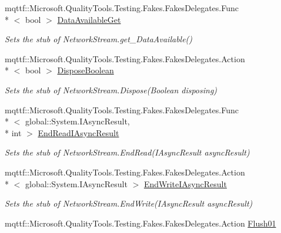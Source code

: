 \begin{DoxyCompactItemize}
mqttf\-::\-Microsoft.\-Quality\-Tools.\-Testing.\-Fakes.\-Fakes\-Delegates.\-Func\\*
$<$ bool $>$ \hyperlink{class_system_1_1_net_1_1_sockets_1_1_fakes_1_1_stub_network_stream_a80472e11e8e2899d3ed3ba4c75589400}{Data\-Available\-Get}
\begin{DoxyCompactList}\small\item\em Sets the stub of Network\-Stream.\-get\-\_\-\-Data\-Available()\end{DoxyCompactList}\item 
mqttf\-::\-Microsoft.\-Quality\-Tools.\-Testing.\-Fakes.\-Fakes\-Delegates.\-Action\\*
$<$ bool $>$ \hyperlink{class_system_1_1_net_1_1_sockets_1_1_fakes_1_1_stub_network_stream_a6d42717e5de4bef02ac4aacc6b019490}{Dispose\-Boolean}
\begin{DoxyCompactList}\small\item\em Sets the stub of Network\-Stream.\-Dispose(\-Boolean disposing)\end{DoxyCompactList}\item 
mqttf\-::\-Microsoft.\-Quality\-Tools.\-Testing.\-Fakes.\-Fakes\-Delegates.\-Func\\*
$<$ global\-::\-System.\-I\-Async\-Result, \\*
int $>$ \hyperlink{class_system_1_1_net_1_1_sockets_1_1_fakes_1_1_stub_network_stream_a0d65abf86c23200970a6363f9e402490}{End\-Read\-I\-Async\-Result}
\begin{DoxyCompactList}\small\item\em Sets the stub of Network\-Stream.\-End\-Read(\-I\-Async\-Result async\-Result)\end{DoxyCompactList}\item 
mqttf\-::\-Microsoft.\-Quality\-Tools.\-Testing.\-Fakes.\-Fakes\-Delegates.\-Action\\*
$<$ global\-::\-System.\-I\-Async\-Result $>$ \hyperlink{class_system_1_1_net_1_1_sockets_1_1_fakes_1_1_stub_network_stream_a7675e9edc46f8d6b9d215056907ff393}{End\-Write\-I\-Async\-Result}
\begin{DoxyCompactList}\small\item\em Sets the stub of Network\-Stream.\-End\-Write(\-I\-Async\-Result async\-Result)\end{DoxyCompactList}\item 
mqttf\-::\-Microsoft.\-Quality\-Tools.\-Testing.\-Fakes.\-Fakes\-Delegates.\-Action \hyperlink{class_system_1_1_net_1_1_sockets_1_1_fakes_1_1_stub_network_stream_a44ff40ec4abb0c7512adf694e7f01493}{Flush01}

\end{DoxyCompactItemize}
